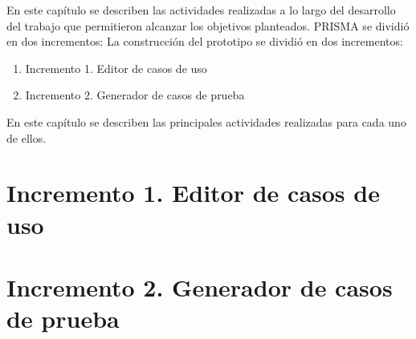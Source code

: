 	En este capítulo se describen las actividades realizadas a lo largo del desarrollo del trabajo que permitieron alcanzar los objetivos planteados. PRISMA se dividió en dos incrementos:
	La construcción del prototipo se dividió en dos incrementos:
	\begin{enumerate}
		\item Incremento 1. Editor de casos de uso
		\item Incremento 2. Generador de casos de prueba
	\end{enumerate}
	
	 En este capítulo se describen las principales actividades realizadas para cada uno de ellos.
	
	\section{Incremento 1. Editor de casos de uso}
	
	\section{Incremento 2. Generador de casos de prueba}
	

	
	
	
	